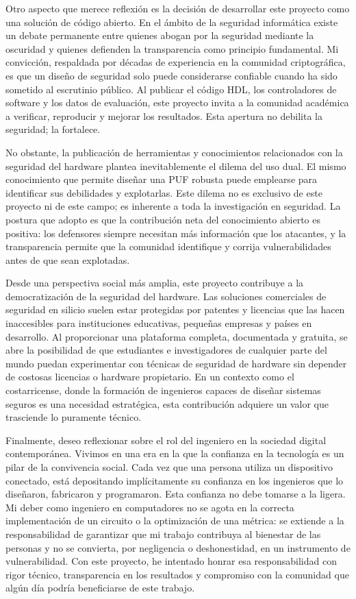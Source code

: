 Otro aspecto que merece reflexión es la decisión de desarrollar este proyecto
como una solución de código abierto. En el ámbito de la seguridad informática
existe un debate permanente entre quienes abogan por la seguridad mediante la
oscuridad y quienes defienden la transparencia como principio fundamental. Mi
convicción, respaldada por décadas de experiencia en la comunidad criptográfica,
es que un diseño de seguridad solo puede considerarse confiable cuando ha sido
sometido al escrutinio público. Al publicar el código HDL, los controladores de
software y los datos de evaluación, este proyecto invita a la comunidad académica
a verificar, reproducir y mejorar los resultados. Esta apertura no debilita la
seguridad; la fortalece.

No obstante, la publicación de herramientas y conocimientos relacionados con la
seguridad del hardware plantea inevitablemente el dilema del uso dual. El mismo
conocimiento que permite diseñar una PUF robusta puede emplearse para identificar
sus debilidades y explotarlas. Este dilema no es exclusivo de este proyecto ni de
este campo; es inherente a toda la investigación en seguridad. La postura que
adopto es que la contribución neta del conocimiento abierto es positiva: los
defensores siempre necesitan más información que los atacantes, y la
transparencia permite que la comunidad identifique y corrija vulnerabilidades
antes de que sean explotadas.

Desde una perspectiva social más amplia, este proyecto contribuye a la
democratización de la seguridad del hardware. Las soluciones comerciales de
seguridad en silicio suelen estar protegidas por patentes y licencias que las
hacen inaccesibles para instituciones educativas, pequeñas empresas y países en
desarrollo. Al proporcionar una plataforma completa, documentada y gratuita, se
abre la posibilidad de que estudiantes e investigadores de cualquier parte del
mundo puedan experimentar con técnicas de seguridad de hardware sin depender de
costosas licencias o hardware propietario. En un contexto como el
costarricense, donde la formación de ingenieros capaces de diseñar sistemas
seguros es una necesidad estratégica, esta contribución adquiere un valor que
trasciende lo puramente técnico.

Finalmente, deseo reflexionar sobre el rol del ingeniero en la sociedad digital
contemporánea. Vivimos en una era en la que la confianza en la tecnología es un
pilar de la convivencia social. Cada vez que una persona utiliza un dispositivo
conectado, está depositando implícitamente su confianza en los ingenieros que lo
diseñaron, fabricaron y programaron. Esta confianza no debe tomarse a la ligera.
Mi deber como ingeniero en computadores no se agota en la correcta
implementación de un circuito o la optimización de una métrica: se extiende a la
responsabilidad de garantizar que mi trabajo contribuya al bienestar de las
personas y no se convierta, por negligencia o deshonestidad, en un instrumento
de vulnerabilidad. Con este proyecto, he intentado honrar esa responsabilidad
con rigor técnico, transparencia en los resultados y compromiso con la comunidad
que algún día podría beneficiarse de este trabajo.
